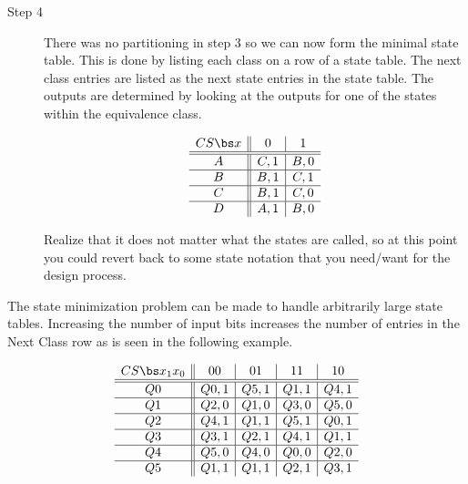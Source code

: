 \begin{description}
\item[Step 4]
There was no partitioning in step 3 so we can now form the minimal
state table.  This is done by listing each class on a row of a 
state table.  The next class entries are listed as the next state
entries in the state table.  The outputs are determined by looking
at the outputs for one of the states within the equivalence class.

$$ \begin{array} {c||c|c}
	CS \bs x & 0     & 1    \\ \hline \hline
	A       & C,1  & B,0 \\ \hline
	B       & B,1  & C,1 \\ \hline
	C       & B,1  & C,0 \\ \hline
	D       & A,1  & B,0 \\ 
\end{array} $$ 

Realize that it does not matter what the states are
called, so at this point you could revert back to some state notation
that you need/want for the design process.
\end{description}

The state minimization problem can be made to handle arbitrarily
large state tables.  Increasing the number of input bits increases the
number of entries in the  Next Class row as is seen in the following example.

$$ \begin{array} {c||c|c|c|c}
  CS \bs x_1 x_0 & 00    & 01   & 11    & 10   \\ \hline \hline
        Q0       & Q0,1  & Q5,1 & Q1,1  & Q4,1 \\ \hline
        Q1       & Q2,0  & Q1,0 & Q3,0  & Q5,0 \\ \hline
        Q2       & Q4,1  & Q1,1 & Q5,1  & Q0,1 \\ \hline
        Q3       & Q3,1  & Q2,1 & Q4,1  & Q1,1 \\ \hline
        Q4       & Q5,0  & Q4,0 & Q0,0  & Q2,0 \\ \hline
        Q5       & Q1,1  & Q1,1 & Q2,1  & Q3,1 \\
\end{array} $$

